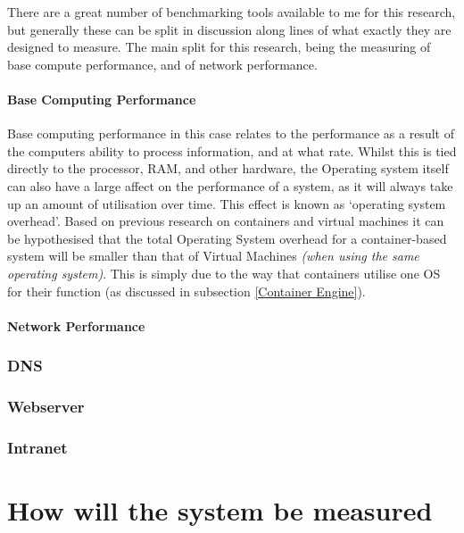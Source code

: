 There are a great number of benchmarking tools available to me for this research, but generally these can be split in discussion along lines of what exactly they are designed to measure. The main split for this research, being the measuring of base compute performance, and of network performance.

\subsubsection{Base Computing Performance}
Base computing performance in this case relates to the performance as a result of the computers ability to process information, and at what rate. Whilst this is tied directly to the processor, RAM, and other hardware, the Operating system itself can also have a large affect on the performance of a system, as it will always take up an amount of utilisation over time. This effect is known as `operating system overhead'. Based on previous research on containers and virtual machines it can be hypothesised that the total Operating System overhead for a container-based system will be smaller than that of Virtual Machines \emph{(when using the same operating system)}. This is simply due to the way that containers utilise one OS for their function (as discussed in subsection \ref{Container Engine}).

\subsubsection{Network Performance}

\subsection{DNS}

\subsection{Webserver}

\subsection{Intranet}

\chapter{How will the system be measured}
